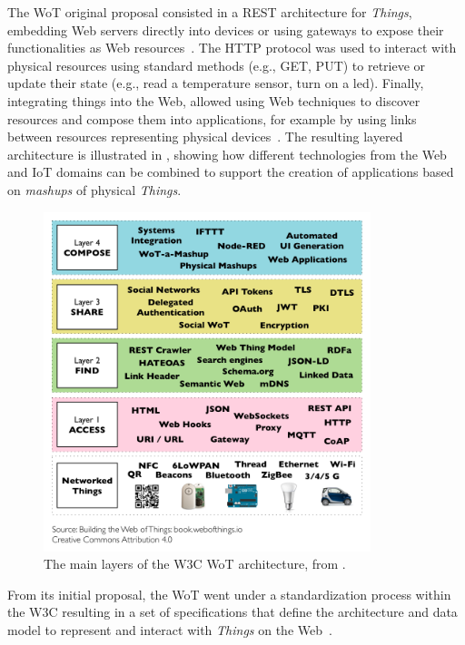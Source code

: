 The \ac{WoT} original proposal consisted in a \ac{REST} architecture for \emph{Things}, embedding Web servers directly into devices or using gateways to expose their functionalities as Web resources~\cite{Guinard_Trifa_Wilde_2010}.
%
The \ac{HTTP} protocol was used to interact with physical resources using standard methods (e.g., GET, PUT) to retrieve or update their state (e.g., read a temperature sensor, turn on a led).
%
Finally, integrating things into the Web, allowed using Web techniques to discover resources and compose them into applications, for example by using links between resources representing physical devices~\cite{dguinard:phdthesis:2011}.
%
The resulting layered architecture is illustrated in , showing how different technologies from the Web and \ac{IoT} domains can be combined to support the creation of applications based on \emph{mashups} of physical \emph{Things}.

\begin{figure}[t]
    \centering
    \includegraphics[width=0.85\textwidth]{figures/wot-layers.png}
    \caption{The main layers of the \ac{W3C} \ac{WoT} architecture, from \cite{Guinard_Trifa_2016_book}.}
    \label{fig:wot-layers}
\end{figure}

From its initial proposal, the \ac{WoT} went under a standardization process within the \ac{W3C} resulting in a set of specifications that define the architecture and data model to represent and interact with \emph{Things} on the Web~\cite{wot-arch,wot-td}.


